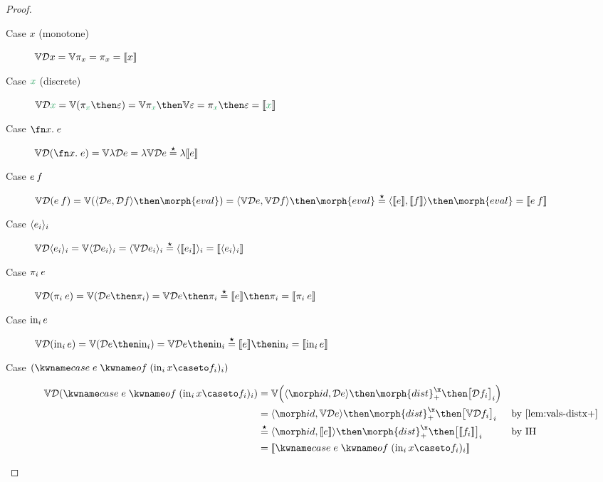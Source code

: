 \documentclass{rntz}\usepackage{fantasy}%
\begin{document}
\begin{proof}
  \begin{description}
  \item[Case $x$ (monotone)] \( \mathbb{V}{\mathcal{D} x} = \mathbb{V}\pi_x = \pi_x = \llbracket{x}\rrbracket \)

  \item[Case $\dvar x$ (discrete)] \( \vals{\incdens {\dvar x}}
    = \vals{(\pi_{\dvar x} \then \varepsilon)}
    = \vals\pi_{\dvar x} \then \vals\varepsilon
    = \pi_{\dvar x} \then \varepsilon
    = \den{\dvar x} \)

  \item[Case $\fnof x e$]
    \( \vals{\incden{\fnof x e}}
    = \vals{\lambda\incdens e}
    = \lambda\vals{\incdens e}
    \stareq \lambda\den{e}
    \)

  \item[Case $e\<f$]
    \( \vals{\incden{e\<f}}
    = \vals{(\tuple{\incdens e, \incdens f} \then \morph{eval})}
    = \tuple{\vals{\incdens e}, \vals{\incdens f}} \then \morph{eval}
    \stareq \tuple{\den e, \den f} \then \morph{eval}
    = \den{e\<f}
    \)

  \item[Case $\langle{e_i}\rangle_i$]
    \( \mathbb{V}{\mathcal{D}\langle{e_i}\rangle_i}
    = \mathbb{V}{\langle{\mathcal{D}{e_i}}\rangle_i}
    = \langle{\ensuremath{\mathbb{V}}{\mathcal{D}{e_i}}}\rangle_i
    \overset{\boldsymbol\star}{=} \langle{\ensuremath{\llbracket{e_i}\rrbracket}}\rangle_i = \llbracket{\langle{e_i}\rangle_i}\rrbracket
    \)

  \item[Case $\pi_i\<e$]
    \( \vals{\incden{\pi_i\<e}} = \vals{(\incdens e \then \pi_i)}
    = \vals\incdens e \then \pi_i \stareq \den{e} \then \pi_i = \den{\pi_i\<e}
    \)

  \item[Case $\mathrm{in}_{i}\, e$]
    \(
    \vals{\incden{\inj i e}} = \vals{(\incdens e \then \injc_i)}
    = \vals\incdens e \then \injc_i
    \stareq \den{e} \then \injc_i = \den{\inj i e}
    \)

  \item[Case $(\ecase{e} (\inj i x \caseto f_i)_i)$]
    \begin{align*}
      \vals{\incden{\ecase{e} (\inj i x \caseto f_i)_i}}
      &= \vals{\left(\tuple{\id, \incdens{e}} \then \morph{dist}^\x_+
        \then \bigkrof{\incdens{f_i}}_i\right)}
      \\
      &= \tuple{\id,\vals\incdens e} \then \morph{dist}^\x_+
      \then \bigkrof{\vals\incdens{f_i}}_i
      && \text{by \cref{lem:vals-distx+}}
      \\
      &\stareq \tuple{\id, \den e} \then \morph{dist}^\x_+ \then \bigkrof{\den{f_i}}_i
      && \text{by IH}
      \\
      &= \den{\ecase{e} (\inj i x \caseto f_i)_i}
    \end{align*}


\end{description}
\end{proof}
\end{document}
